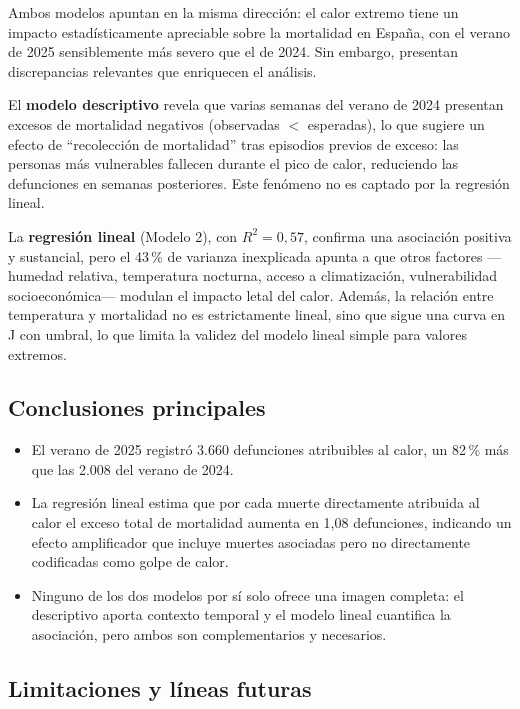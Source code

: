 \documentclass[11pt, a4paper]{article}
\begin{document}
Ambos modelos apuntan en la misma dirección: el calor extremo tiene un impacto
estadísticamente apreciable sobre la mortalidad en España, con el verano de
2025 sensiblemente más severo que el de 2024. Sin embargo, presentan
discrepancias relevantes que enriquecen el análisis.

El \textbf{modelo descriptivo} revela que varias semanas del verano de 2024
presentan excesos de mortalidad negativos (observadas $<$ esperadas), lo que
sugiere un efecto de ``recolección de mortalidad'' tras episodios previos de
exceso: las personas más vulnerables fallecen durante el pico de calor,
reduciendo las defunciones en semanas posteriores. Este fenómeno no es captado
por la regresión lineal.

La \textbf{regresión lineal} (Modelo 2), con $R^2 = 0{,}57$, confirma una
asociación positiva y sustancial, pero el 43\,\% de varianza inexplicada
apunta a que otros factores —humedad relativa, temperatura nocturna, acceso a
climatización, vulnerabilidad socioeconómica— modulan el impacto letal del
calor. Además, la relación entre temperatura y mortalidad no es estrictamente
lineal, sino que sigue una curva en J con umbral, lo que limita la validez
del modelo lineal simple para valores extremos.

\subsection{Conclusiones principales}

\begin{itemize}
  \item El verano de 2025 registró 3.660 defunciones atribuibles al calor,
        un 82\,\% más que las 2.008 del verano de 2024.
  \item La regresión lineal estima que por cada muerte directamente atribuida
        al calor el exceso total de mortalidad aumenta en 1{,}08 defunciones,
        indicando un efecto amplificador que incluye muertes asociadas pero no
        directamente codificadas como golpe de calor.
  \item Ninguno de los dos modelos por sí solo ofrece una imagen completa:
        el descriptivo aporta contexto temporal y el modelo lineal cuantifica
        la asociación, pero ambos son complementarios y necesarios.
\end{itemize}

\subsection{Limitaciones y líneas futuras}
\end{document}
